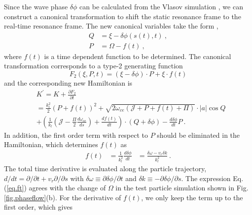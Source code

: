 Since the wave phase $\delta \phi$ can be calculated from the Vlasov simulation
 \cite{zheng2024}, we can construct a canonical transformation to shift the static resonance frame to the real-time resonance frame.
The new canonical variables take the form \cite{berk1999},
\begin{equation}\label{eq.ct}
    \begin{aligned}
        Q &= \xi - \delta \phi(s(t),t)~,
        \\
        P & = \Omega - f(t)~,
    \end{aligned}
\end{equation}
where $f(t)$ is a time dependent function to be determined.
The canonical  transformation corresponds to a type-2 generating function \cite{goldstein2001}
\begin{equation}
    F_2(\xi,P,t) = (\xi - \delta \phi) \cdot P + \xi \cdot f(t)
\end{equation}
and the corresponding new Hamiltonian  is
\begin{equation}
    \begin{aligned}
        &  K^\prime = K + \frac{\partial F_2}{\partial t}
        \\
        & = \frac{k_l^2}{2}(P+f(t))^2 
        + \sqrt{2\omega_{ce}(\mathcal{J}+P+f(t)+\Pi)} \cdot |a|\cos Q 
        \\
        & + \left(\frac{1}{k_l}\left(\mathcal{J} - \frac{\Pi}{2} \frac{d\omega_{ce}}{ds}\right)  +\frac{d f(t)}{d t} \right)\cdot(Q + \delta \phi)  - \frac{d \delta \phi}{d t} P ~. 
        \end{aligned}
\end{equation}
In addition,  the first order term with respect to $P$  should be eliminated in the  Hamiltonian, which determines $f(t)$ as
\begin{equation}\label{eq.ft}
    \begin{aligned}
    f(t) & = \frac{1}{k_l^2} \frac{d \delta \phi}{d t}  &= \frac{\delta \omega - v_r \delta k}{k_l^2}~.
    \end{aligned}
\end{equation} 
The total time derivative is evaluated along the particle trajectory, $d/dt = \partial/\partial t + v_r \partial /\partial s$ with $\delta \omega  \equiv \partial \delta \phi/\partial t$ and $\delta k  \equiv -\partial \delta \phi/\partial s$.
The expression Eq. (\ref{eq.ft}) agrees with the change of $\Omega$ in the test particle simulation shown in Fig. \ref{fig.phaseflow}(b).
For the derivative of $f(t)$, we only keep the term up to the first order, which gives
